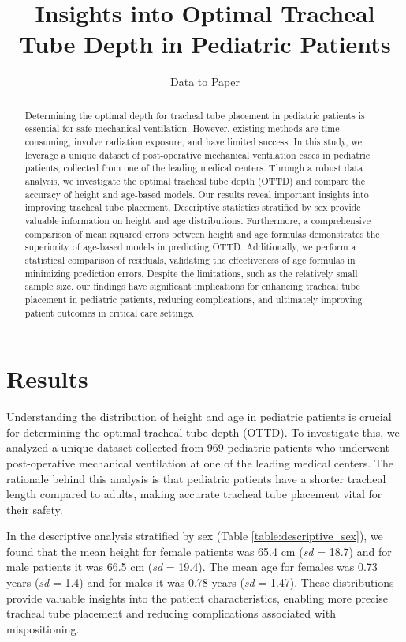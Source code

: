 \documentclass[11pt]{article}
\title{Insights into Optimal Tracheal Tube Depth in Pediatric Patients}
\author{Data to Paper}
\begin{document}
\maketitle
\begin{abstract}
Determining the optimal depth for tracheal tube placement in pediatric patients is essential for safe mechanical ventilation. However, existing methods are time-consuming, involve radiation exposure, and have limited success. In this study, we leverage a unique dataset of post-operative mechanical ventilation cases in pediatric patients, collected from one of the leading medical centers. Through a robust data analysis, we investigate the optimal tracheal tube depth (OTTD) and compare the accuracy of height and age-based models. Our results reveal important insights into improving tracheal tube placement. Descriptive statistics stratified by sex provide valuable information on height and age distributions. Furthermore, a comprehensive comparison of mean squared errors between height and age formulas demonstrates the superiority of age-based models in predicting OTTD. Additionally, we perform a statistical comparison of residuals, validating the effectiveness of age formulas in minimizing prediction errors. Despite the limitations, such as the relatively small sample size, our findings have significant implications for enhancing tracheal tube placement in pediatric patients, reducing complications, and ultimately improving patient outcomes in critical care settings.
\end{abstract}
\section*{Results}

Understanding the distribution of height and age in pediatric patients is crucial for determining the optimal tracheal tube depth (OTTD). To investigate this, we analyzed a unique dataset collected from 969 pediatric patients who underwent post-operative mechanical ventilation at one of the leading medical centers. The rationale behind this analysis is that pediatric patients have a shorter tracheal length compared to adults, making accurate tracheal tube placement vital for their safety.

In the descriptive analysis stratified by sex (Table {}\ref{table:descriptive_sex}), we found that the mean height for female patients was 65.4 cm (\textit{sd} = 18.7) and for male patients it was 66.5 cm (\textit{sd} = 19.4). The mean age for females was 0.73 years (\textit{sd} = 1.4) and for males it was 0.78 years (\textit{sd} = 1.47). These distributions provide valuable insights into the patient characteristics, enabling more precise tracheal tube placement and reducing complications associated with mispositioning.
\end{document}
